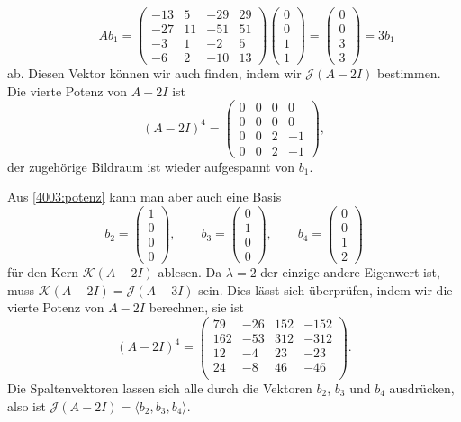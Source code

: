 \begin{loesung}
\[\qquad
Ab_1 = 
\begin{pmatrix}
-13&  5& -29& 29\\
-27& 11& -51& 51\\
 -3&  1&  -2&  5\\
 -6&  2& -10& 13
\end{pmatrix}
\begin{pmatrix} 0\\0\\1\\1\end{pmatrix}
=
\begin{pmatrix}
0\\0\\3\\3
\end{pmatrix}
=
3b_1
\]
ab.
Diesen  Vektor können wir auch finden, indem wir $\mathcal{J}(A-2I)$
bestimmen.
Die vierte Potenz von $A-2I$ ist
\begin{equation}
(A-2I)^4
=
\begin{pmatrix}
   0&  0&  0&  0\\
   0&  0&  0&  0\\
   0&  0&  2& -1\\
   0&  0&  2& -1
\end{pmatrix},
\label{4003:potenz}
\end{equation}
der zugehörige Bildraum ist wieder aufgespannt von $b_1$.

Aus \eqref{4003:potenz} kann man aber auch eine Basis
\[
b_2
=
\begin{pmatrix}1\\0\\0\\0\end{pmatrix}
,\qquad
b_3
=
\begin{pmatrix}0\\1\\0\\0\end{pmatrix}
,\qquad
b_4
=
\begin{pmatrix}0\\0\\1\\2\end{pmatrix}
\]
für den Kern $\mathcal{K}(A-2I)$ ablesen.
Da $\lambda=2$ der einzige andere Eigenwert ist, muss $\mathcal{K}(A-2I)
= \mathcal{J}(A-3I)$ sein.
Dies lässt sich überprüfen, indem wir die vierte Potenz von $A-2I$
berechnen, sie ist
\[
(A-2I)^4
=
\begin{pmatrix}
    79&  -26&  152& -152\\
   162&  -53&  312& -312\\
    12&   -4&   23&  -23\\
    24&   -8&   46&  -46\\
\end{pmatrix}.
\]
Die Spaltenvektoren lassen sich alle durch die Vektoren $b_2$, $b_3$
und $b_4$ ausdrücken, also ist $\mathcal{J}(A-2I)=\langle b_2,b_3,b_4\rangle$.


\end{loesung}
